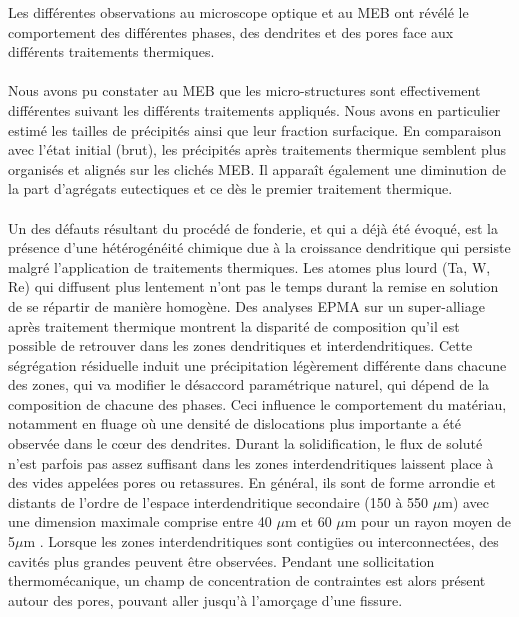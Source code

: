 Les différentes observations au microscope optique et au MEB ont révélé le comportement des différentes phases, des dendrites et des pores face aux différents traitements thermiques. 
\\
\\
Nous avons pu constater au MEB que les micro-structures sont effectivement différentes suivant les différents traitements appliqués. Nous avons en particulier estimé les tailles de précipités ainsi que leur fraction surfacique. En comparaison avec l’état initial (brut), les précipités après traitements thermique semblent plus organisés et alignés sur les clichés MEB. Il apparaît également une diminution de la part d'agrégats eutectiques et ce dès le premier traitement thermique.
\\
\\
Un des défauts résultant du procédé de fonderie, et qui a déjà été évoqué, est la présence d’une hétérogénéité chimique due à la croissance dendritique qui persiste malgré l’application de traitements thermiques. Les atomes plus lourd (Ta, W, Re) qui diffusent plus lentement n’ont pas le temps durant la remise en solution de se répartir de manière homogène. Des analyses EPMA sur un super-alliage après traitement thermique montrent la disparité de composition qu’il est possible de retrouver dans les zones dendritiques et interdendritiques.
Cette ségrégation résiduelle induit une précipitation légèrement différente dans chacune des zones, qui va modifier le désaccord paramétrique naturel, qui dépend de la composition de chacune des phases. Ceci influence le comportement du matériau, notamment en fluage où une densité de dislocations plus importante a été observée dans le cœur des dendrites.
Durant la solidification, le flux de soluté n’est parfois pas assez suffisant dans les zones interdendritiques laissent place à des vides appelées pores ou retassures. En général, ils sont de forme arrondie et distants de l'ordre de l'espace interdendritique secondaire (150 à 550 $\mu$m) avec une dimension maximale comprise entre 40 $\mu$m et 60 $\mu$m pour un rayon moyen de 5$\mu$m . Lorsque les zones interdendritiques sont contigües ou interconnectées, des cavités plus grandes peuvent être observées. Pendant une sollicitation thermomécanique, un champ de concentration de contraintes est alors présent autour des pores, pouvant aller jusqu’à l’amorçage d’une fissure.